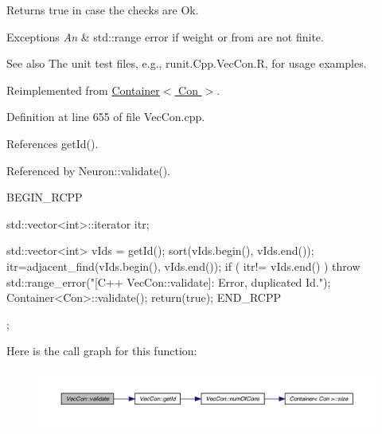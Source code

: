 \begin{DoxyReturn}{Returns}
true in case the checks are Ok.
\end{DoxyReturn}

\begin{DoxyExceptions}{Exceptions}
{\em An} & std::range error if weight or from are not finite.\\
\hline
\end{DoxyExceptions}
\begin{DoxySeeAlso}{See also}
The unit test files, e.g., runit.Cpp.VecCon.R, for usage examples. 
\end{DoxySeeAlso}


Reimplemented from \hyperlink{class_container_aa99a036fd0fe6d6b82ba558157e557d3}{Container$<$ Con $>$}.



Definition at line 655 of file VecCon.cpp.



References getId().



Referenced by Neuron::validate().


\begin{DoxyCode}
                      {
        BEGIN_RCPP

        std::vector<int>::iterator itr;

        std::vector<int> vIds = getId();
        sort(vIds.begin(), vIds.end());
        itr=adjacent_find(vIds.begin(), vIds.end());
        if ( itr!= vIds.end() )  throw std::range_error("[C++ VecCon::validate]: 
      Error, duplicated Id.");
        Container<Con>::validate();
        return(true);
        END_RCPP

};
\end{DoxyCode}


Here is the call graph for this function:\nopagebreak
\begin{figure}[H]
\begin{center}
\leavevmode
\includegraphics[width=400pt]{class_vec_con_af008396d3982fb7ccf1af9618b89937c_cgraph}
\end{center}
\end{figure}




